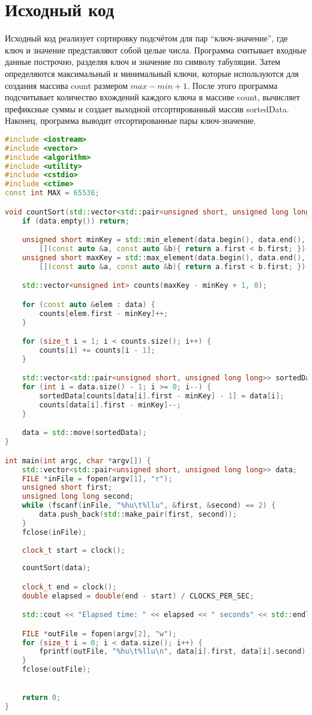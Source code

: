 \section{Исходный код}
Исходный код реализует сортировку подсчётом для пар \enquote{ключ-значение}, где ключ и значение представляют собой целые числа. Программа считывает входные данные построчно, разделяя ключ и значение по символу табуляции. Затем определяются максимальный и минимальный ключи, которые используются для создания массива count размером $max - min + 1$. После этого программа подсчитывает количество вхождений каждого ключа в массиве count, вычисляет префиксные суммы и создает выходной отсортированный массив sortedData. Наконец, программа выводит отсортированные пары ключ-значение.
\begin{lstlisting}[language=C++]
#include <iostream>
#include <vector>
#include <algorithm>
#include <utility>
#include <cstdio>
#include <ctime>
const int MAX = 65536;

void countSort(std::vector<std::pair<unsigned short, unsigned long long>> &data) {
    if (data.empty()) return;

    unsigned short minKey = std::min_element(data.begin(), data.end(),
        [](const auto &a, const auto &b){ return a.first < b.first; })->first;
    unsigned short maxKey = std::max_element(data.begin(), data.end(),
        [](const auto &a, const auto &b){ return a.first < b.first; })->first;

    std::vector<unsigned int> counts(maxKey - minKey + 1, 0);

    for (const auto &elem : data) {
        counts[elem.first - minKey]++;
    }

    for (size_t i = 1; i < counts.size(); i++) {
        counts[i] += counts[i - 1];
    }

    std::vector<std::pair<unsigned short, unsigned long long>> sortedData(data.size());
    for (int i = data.size() - 1; i >= 0; i--) {
        sortedData[counts[data[i].first - minKey] - 1] = data[i];
        counts[data[i].first - minKey]--;
    }

    data = std::move(sortedData);
}

int main(int argc, char *argv[]) {
    std::vector<std::pair<unsigned short, unsigned long long>> data;
    FILE *inFile = fopen(argv[1], "r");
    unsigned short first;
    unsigned long long second;
    while (fscanf(inFile, "%hu\t%llu", &first, &second) == 2) {
        data.push_back(std::make_pair(first, second));
    }
    fclose(inFile);
    
    clock_t start = clock();
    
    countSort(data);

    clock_t end = clock();
    double elapsed = double(end - start) / CLOCKS_PER_SEC;

    std::cout << "Elapsed time: " << elapsed << " seconds" << std::endl;

    FILE *outFile = fopen(argv[2], "w");
    for (size_t i = 0; i < data.size(); i++) {
        fprintf(outFile, "%hu\t%llu\n", data[i].first, data[i].second);
    }
    fclose(outFile);

    
    return 0;
}
	
\end{lstlisting}


